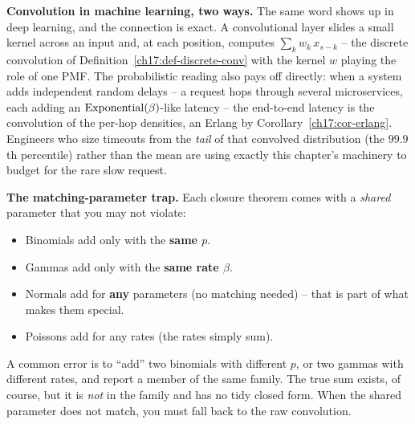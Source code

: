 \begin{applicationbox}
\textbf{Convolution in machine learning, two ways.} The same word shows up
in deep learning, and the connection is exact. A convolutional layer slides
a small kernel across an input and, at each position, computes
$\sum_k w_k\,x_{s-k}$ -- the discrete convolution of
Definition~\ref{ch17:def-discrete-conv} with the kernel $w$ playing the role
of one PMF. The probabilistic reading also pays off directly: when a system
adds independent random delays -- a request hops through several
microservices, each adding an $\operatorname{Exponential}(\beta)$-like latency -- the end-to-end
latency is the convolution of the per-hop densities, an Erlang by
Corollary~\ref{ch17:cor-erlang}. Engineers who size timeouts from the
\emph{tail} of that convolved distribution (the $99.9$th percentile) rather
than the mean are using exactly this chapter's machinery to budget for the
rare slow request.
\end{applicationbox}

\begin{trapbox}
\textbf{The matching-parameter trap.} Each closure theorem comes with a
\emph{shared} parameter that you may not violate:
\begin{itemize}
  \item Binomials add only with the \textbf{same $p$}.
  \item Gammas add only with the \textbf{same rate $\beta$}.
  \item Normals add for \textbf{any} parameters (no matching needed) --
        that is part of what makes them special.
  \item Poissons add for any rates (the rates simply sum).
\end{itemize}
A common error is to ``add'' two binomials with different $p$, or two
gammas with different rates, and report a member of the same family. The
true sum exists, of course, but it is \emph{not} in the family and has no
tidy closed form. When the shared parameter does not match, you must fall
back to the raw convolution.
\end{trapbox}

